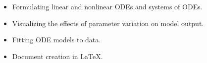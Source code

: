 \documentclass[article, 11pt]{article}
\begin{document}
\noindent {}

\vspace{-.35cm}
\noindent \hrulefill

\begin{itemize}
	\item Formulating linear and nonlinear ODEs and systems of ODEs.  
	\item Visualizing the effects of parameter variation on model output.
	\item Fitting ODE models to data. 
	\item Document creation in \LaTeX. 
\end{itemize}

\noindent \hrulefill
\end{document}

